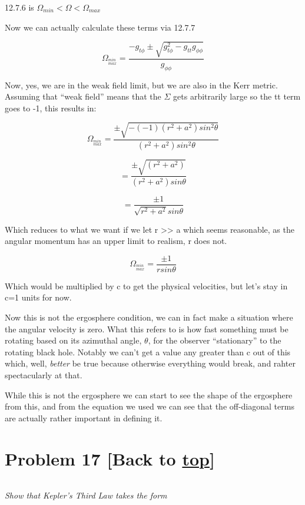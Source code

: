 \documentclass[landscape,letterpaper,10pt,english]{article}
\begin{document}
    12.7.6 is \(\Omega_{min} < \Omega < \Omega_{max}\)

Now we can actually calculate these terms via 12.7.7

\[ \Omega_{ ^{min}_{max}} = \frac{-g_{t\phi} \pm \sqrt{g^2_{t\phi} - g_{tt}g_{\phi\phi}}}{g_{\phi\phi}}\]

    Now, yes, we are in the weak field limit, but we are also in the Kerr
metric. Assuming that ``weak field'' means that the \(\Sigma\) gets
arbitrarily large so the tt term goes to -1, this results in:

\[ \Omega_{ ^{min}_{max}} = \frac{ \pm \sqrt{ - (-1)(r^2+a^2)sin^2\theta}}{(r^2+a^2)sin^2\theta}\]

\[ = \frac{ \pm \sqrt{(r^2+a^2)}}{(r^2+a^2)sin\theta}\]

\[ = \frac{ \pm 1}{\sqrt{r^2+a^2}sin\theta}\]

    Which reduces to what we want if we let r \textgreater\textgreater{} a
which seems reasonable, as the angular momentum has an upper limit to
realism, r does not.

\[ \Omega_{ ^{min}_{max}} = \frac{ \pm 1}{r sin\theta}\]

Which would be multiplied by c to get the physical velocities, but let's
stay in c=1 units for now.

    Now this is not the ergosphere condition, we can in fact make a
situation where the angular velocity is zero. What this refers to is how
fast something must be rotating based on its azimuthal angle,
\(\theta\), for the observer ``stationary'' to the rotating black hole.
Notably we can't get a value any greater than c out of this which, well,
\emph{better} be true because otherwise everything would break, and
rahter spectacularly at that.

While this is not the ergosphere we can start to see the shape of the
ergosphere from this, and from the equation we used we can see that the
off-diagonal terms are actually rather important in defining it.

    \hypertarget{problem-17-back-to-top}{%
\section{\texorpdfstring{Problem 17 {[}Back to
\hyperref[toc]{top}{]}}{Problem 17 {[}Back to {]}}}\label{problem-17-back-to-top}}

\[\label{P17}\]

\emph{Show that Kepler's Third Law takes the form}
\end{document}
